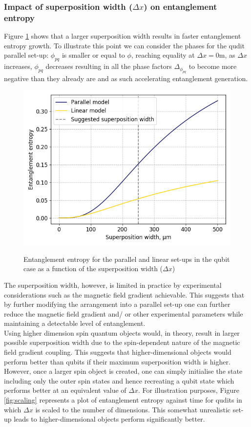 \documentclass[%
 12pt,
 superscriptaddress,
 amsmath,
 amssymb,
 onecolumn,
 longbibliography
]{revtex4-2}
\begin{document}
\begin{appendices}
\subsubsection{Impact of superposition width ($\Delta x$) on entanglement  entropy\label{sec:superposition_width}}

\indent Figure \ref{fig:superposition_width} shows that a larger superposition width results in faster entanglement entropy growth. To illustrate this point we can consider the phases for the qudit parallel set-up: $\phi_{pq}$ is smaller or equal to $\phi$, reaching equality at $\Delta x=0$m, as $\Delta x$ increases, $\phi_{pq}$ decreases resulting in all the phase factors $\Delta_{\phi_{pq}}$ to become more negative than they already are and as such accelerating entanglement generation. 
    \begin{figure}
	\centering
	    	\includegraphics[width=0.5\columnwidth]{VNE_delta_x_comp.png}
	    	\caption{Entanglement entropy for the parallel and linear set-ups in the qubit case as a function of the superposition width ($\Delta x$)}\par\medskip \label{fig:superposition_width}
	\end{figure}

\indent The superposition width, however, is limited in practice by experimental considerations such as the magnetic field gradient achievable. This suggests that by further modifying the arrangement into a parallel set-up one can further reduce the magnetic field gradient and/ or other experimental parameters while maintaining a detectable level of entanglement.\\
\indent Using higher dimension spin quantum objects would, in theory, result in larger possible superposition width due to the spin-dependent nature of the magnetic field gradient coupling. This suggests that higher-dimensional objects would perform better than qubits if their maximum superposition width is higher. However, once a larger spin object is created, one can simply initialise the state including only the outer spin states and hence recreating a qubit state which performs better at an equivalent value of $\Delta x$. For illustration purposes, Figure \ref{fig:scaling} represents a plot of entanglement entropy against time for qudits in which $\Delta x$ is scaled to the number of dimensions. This somewhat unrealistic set-up leads to higher-dimensional objects perform significantly better.


\end{appendices}
\end{document}
